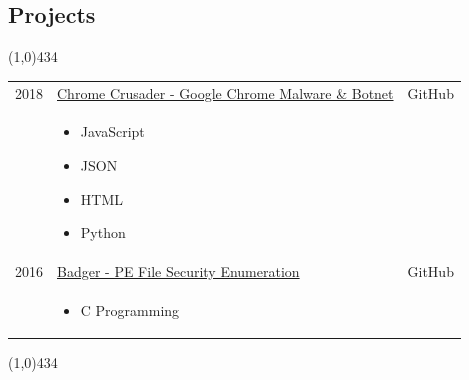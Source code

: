 \documentclass{res}
\newcommand{\frstCVcell}{2.5cm}
\begin{document}
\begin{resume}
  \pagebreak
  \section{Projects}
  \line(1,0){434}
  \newline
  \newline
  \begin{tabularx}{\textwidth}{p{\frstCVcell}Xc}
    2018 & \href{https://github.com/lillypad/chrome-crusader}{Chrome Crusader - Google Chrome Malware \& Botnet} & GitHub\\
    &
    \begin{itemize}
    \item JavaScript
    \item JSON
    \item HTML
    \item Python
    \end{itemize}
    & \\
    2016 & \href{https://github.com/lillypad/badger}{Badger - PE File Security Enumeration} & GitHub\\
    &
    \begin{itemize}
    \item C Programming
    \end{itemize}
    & \\
    \end{tabularx}
  \newline
  \line(1,0){434}

  \pagebreak

\end{resume}
\end{document}
